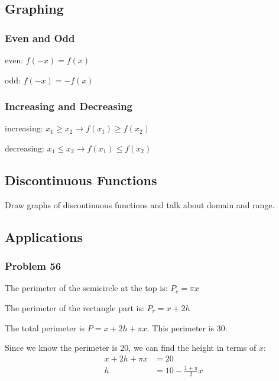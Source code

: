 \documentclass[letterpaper, landscape]{exam}
\begin{document}
  \subsection{Graphing}

  \subsubsection{Even and Odd}
    \begin{itemize*}
      \item even: $f(-x) = f(x)$
      \item odd: $f(-x) = -f(x)$
    \end{itemize*}

  \subsubsection{Increasing and Decreasing}
    \begin{itemize*}
      \item increasing: $x_1 \geq x_2 \rightarrow f(x_1) \geq f(x_2)$
      \item decreasing: $x_1 \leq x_2 \rightarrow f(x_1) \leq f(x_2)$
    \end{itemize*}

  \subsection{Discontinuous Functions}

  Draw graphs of discontinuous functions and talk about domain and range.

  \subsection{Applications}

  \subsubsection{Problem 56}
  \begin{itemize*}
    \item The perimeter of the semicircle at the top is: $P_c = \pi x$
    \item The perimeter of the rectangle part is: $P_r = x + 2h$
    \item The total perimeter is $P = x + 2h + \pi x$. This perimeter is 30:
  \end{itemize*}

  Since we know the perimeter is 20, we can find the height in terms of $x$: 
  \begin{align*}
    x + 2h + \pi x & = 20 \\
    h              & = 10-\frac{1 + \pi}{2} x \\
  \end{align*}
\end{document}
